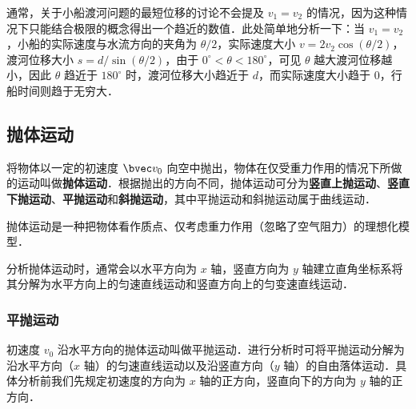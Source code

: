 通常，关于小船渡河问题的最短位移的讨论不会提及 $v_1=v_2$ 的情况，因为这种情况下只能结合极限的概念得出一个趋近的数值．此处简单地分析一下：当 $v_1=v_2$，小船的实际速度与水流方向的夹角为 $\theta /2$，实际速度大小 $v=2v_2\cos(\theta /2)$，渡河位移大小 $s= d/\sin(\theta/2)$，由于 $0^\circ < \theta < 180^\circ $，可见 $\theta$ 越大渡河位移越小，因此 $\theta$ 趋近于 $180^\circ $ 时，渡河位移大小趋近于 $d$，而实际速度大小趋于 $0$，行船时间则趋于无穷大．

\subsection{抛体运动}
将物体以一定的初速度 $\bvec v_0$ 向空中抛出，物体在仅受重力作用的情况下所做的运动叫做\textbf{抛体运动}．根据抛出的方向不同，抛体运动可分为\textbf{竖直上抛运动}、\textbf{竖直下抛运动}、\textbf{平抛运动}和\textbf{斜抛运动}，其中平抛运动和斜抛运动属于曲线运动．

抛体运动是一种把物体看作质点、仅考虑重力作用（忽略了空气阻力）的理想化模型．

分析抛体运动时，通常会以水平方向为 $x$ 轴，竖直方向为 $y$ 轴建立直角坐标系将其分解为水平方向上的匀速直线运动和竖直方向上的匀变速直线运动．

\subsubsection{平抛运动}
初速度 $v_0$ 沿水平方向的抛体运动叫做平抛运动．进行分析时可将平抛运动分解为沿水平方向（$x$ 轴）的匀速直线运动以及沿竖直方向（$y$ 轴）的自由落体运动．具体分析前我们先规定初速度的方向为 $x$ 轴的正方向，竖直向下的方向为 $y$ 轴的正方向．


